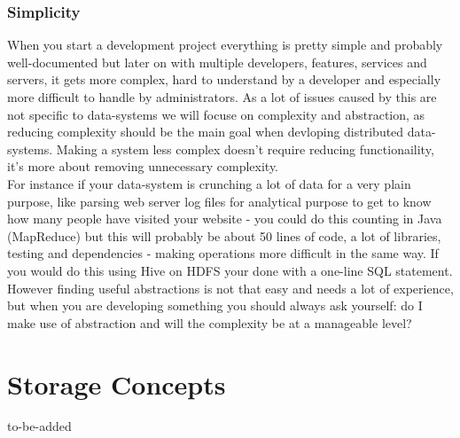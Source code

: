 \subsubsection{Simplicity}
\label{tf_nfreq_maintainability_simplicity}
When you start a development project everything is pretty simple and probably well-documented but later on with multiple developers, features, services and servers, it gets more complex, hard to understand by a developer and especially more difficult to handle by administrators. As a lot of issues caused by this are not specific to data-systems we will focuse on complexity and abstraction, as reducing complexity should be the main goal when devloping distributed data-systems. Making a system less complex doesn't require reducing functionaility, it's more about removing unnecessary complexity.\\
For instance if your data-system is crunching a lot of data for a very plain purpose, like parsing web server log files for analytical purpose to get to know how many people have visited your website - you could do this counting in Java (MapReduce) but this will probably be about 50 lines of code, a lot of libraries, testing and dependencies - making operations more difficult in the same way. If you would do this using Hive on HDFS your done with a one-line SQL statement.\\

However finding useful abstractions is not that easy and needs a lot of experience, but when you are developing something you should always ask yourself: do I make use of abstraction and will the complexity be at a manageable level?


\newpage
\section{Storage Concepts}
\label{tf_storageconcepts}
to-be-added

\newpage

